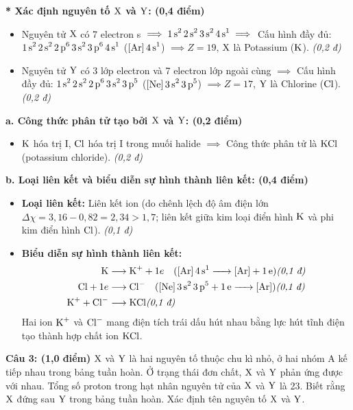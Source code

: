 \documentclass[11pt,a4paper]{article}
\begin{document}
\begin{tcolorbox}[colback=white,colframe=solBlue,title=\textbf{Lời giải chi tiết và Biểu điểm Câu 2:}]
\textbf{* Xác định nguyên tố $\ce{X}$ và $\ce{Y}$: (0,4 điểm)}
\begin{itemize}[leftmargin=1.2cm]
\item Nguyên tử $\ce{X}$ có 7 electron s $\implies \ce{1s^2 2s^2 3s^2 4s^1} \implies$ Cấu hình đầy đủ: $\ce{1s^2 2s^2 2p^6 3s^2 3p^6 4s^1}$ ($\ce{[Ar] 4s^1}$) $\implies Z = 19$, $\ce{X}$ là Potassium ($\ce{K}$). \hfill \textit{(0,2 đ)}
\item Nguyên tử $\ce{Y}$ có 3 lớp electron và 7 electron lớp ngoài cùng $\implies$ Cấu hình đầy đủ: $\ce{1s^2 2s^2 2p^6 3s^2 3p^5}$ ($\ce{[Ne] 3s^2 3p^5}$) $\implies Z = 17$, $\ce{Y}$ là Chlorine ($\ce{Cl}$). \hfill \textit{(0,2 đ)}
\end{itemize}
\textbf{a. Công thức phân tử tạo bởi $\ce{X}$ và $\ce{Y}$: (0,2 điểm)}
\begin{itemize}[leftmargin=1.2cm]
\item $\ce{K}$ hóa trị I, $\ce{Cl}$ hóa trị I trong muối halide $\implies$ Công thức phân tử là $\ce{KCl}$ (potassium chloride). \hfill \textit{(0,2 đ)}
\end{itemize}
\textbf{b. Loại liên kết và biểu diễn sự hình thành liên kết: (0,4 điểm)}
\begin{itemize}[leftmargin=1.2cm]
\item \textbf{Loại liên kết:} Liên kết ion (do chênh lệch độ âm điện lớn $\Delta\chi = 3,16 - 0,82 = 2,34 > 1,7$; liên kết giữa kim loại điển hình $\ce{K}$ và phi kim điển hình $\ce{Cl}$). \hfill \textit{(0,1 đ)}
\item \textbf{Biểu diễn sự hình thành liên kết:}
  \begin{align*}
  \ce{K} &\longrightarrow \ce{K+} + 1e \quad (\ce{[Ar] 4s^1 -> [Ar] + 1e}) \hfill \textit{(0,1 đ)}\\
  \ce{Cl} + 1e &\longrightarrow \ce{Cl-} \quad (\ce{[Ne] 3s^2 3p^5 + 1e -> [Ar]}) \hfill \textit{(0,1 đ)}\\
  \ce{K+} + \ce{Cl-} &\longrightarrow \ce{KCl} \hfill \textit{(0,1 đ)}
  \end{align*}
  Hai ion $\ce{K+}$ và $\ce{Cl-}$ mang điện tích trái dấu hút nhau bằng lực hút tĩnh điện tạo thành hợp chất ion $\ce{KCl}$.
\end{itemize}
\end{tcolorbox}

\vspace{4pt}
\noindent
\textbf{Câu 3: (1,0 điểm)} $\ce{X}$ và $\ce{Y}$ là hai nguyên tố thuộc chu kì nhỏ, ở hai nhóm A kế tiếp nhau trong bảng tuần hoàn. Ở trạng thái đơn chất, $\ce{X}$ và $\ce{Y}$ phản ứng được với nhau. Tổng số proton trong hạt nhân nguyên tử của $\ce{X}$ và $\ce{Y}$ là 23. Biết rằng $\ce{X}$ đứng sau $\ce{Y}$ trong bảng tuần hoàn. Xác định tên nguyên tố $\ce{X}$ và $\ce{Y}$.
\end{document}
